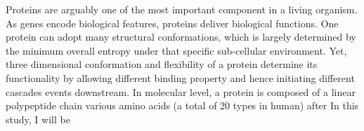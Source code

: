 Proteins are arguably one of the most important component in a living organism. As genes encode biological features, proteins deliver biological functions. One protein can adopt many structural conformations, which is largely determined by the minimum overall entropy under that specific sub-cellular environment. Yet, three dimensional conformation and flexibility of a protein determine its functionality by allowing different binding property and hence initiating different cascades events downstream. In molecular level, a protein is composed of a linear polypeptide chain various amino acids (a total of 20 types in human) after In this study, I will be 